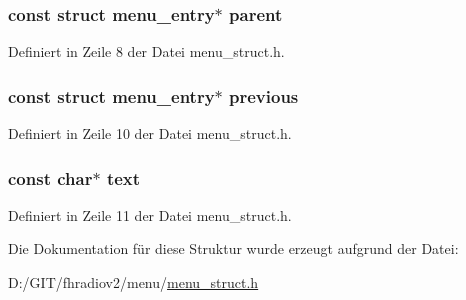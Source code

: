 \subsubsection[{parent}]{\setlength{\rightskip}{0pt plus 5cm}const struct {\bf menu\+\_\+entry}$\ast$ parent}\label{structmenu__entry_ac1b562fabcc9402003931e8351d6faf7}


Definiert in Zeile 8 der Datei menu\+\_\+struct.\+h.

\hypertarget{structmenu__entry_a66676e2c3f7553b50a8c1d0c4e973734}{}
\subsubsection[{previous}]{\setlength{\rightskip}{0pt plus 5cm}const struct {\bf menu\+\_\+entry}$\ast$ previous}\label{structmenu__entry_a66676e2c3f7553b50a8c1d0c4e973734}


Definiert in Zeile 10 der Datei menu\+\_\+struct.\+h.

\hypertarget{structmenu__entry_a16343090e80c4472521560f30113d96c}{}
\subsubsection[{text}]{\setlength{\rightskip}{0pt plus 5cm}const char$\ast$ text}\label{structmenu__entry_a16343090e80c4472521560f30113d96c}


Definiert in Zeile 11 der Datei menu\+\_\+struct.\+h.



Die Dokumentation für diese Struktur wurde erzeugt aufgrund der Datei\+:\begin{DoxyCompactItemize}
\item 
D\+:/\+G\+I\+T/fhradiov2/menu/\hyperlink{menu__struct_8h}{menu\+\_\+struct.\+h}\end{DoxyCompactItemize}
